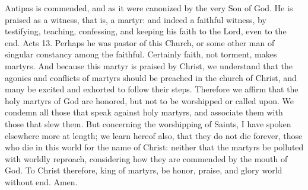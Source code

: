 Antipas is commended, and as it were canonized by the very Son of God. He is praised as a witness, that is, a martyr: and indeed a faithful witness, by testifying, teaching, confessing, and keeping his faith to the Lord, even to the end. Acts 13. Perhaps he was pastor of this Church, or some other man of singular constancy among the faithful. Certainly faith, not torment, makes martyrs. And because this martyr is praised by Christ, we understand that the agonies and conflicts of martyrs should be preached in the church of Christ, and many be excited and exhorted to follow their steps. Therefore we affirm that the holy martyrs of God are honored, but not to be worshipped or called upon. We condemn all those that speak against holy martyrs, and associate them with those that slew them. But concerning the worshipping of Saints, I have spoken elsewhere more at length; we learn hereof also, that they do not die forever, those who die in this world for the name of Christ: neither that the martyrs be polluted with worldly reproach, considering how they are commended by the mouth of God. To Christ therefore, king of martyrs, be honor, praise, and glory world without end. Amen.
